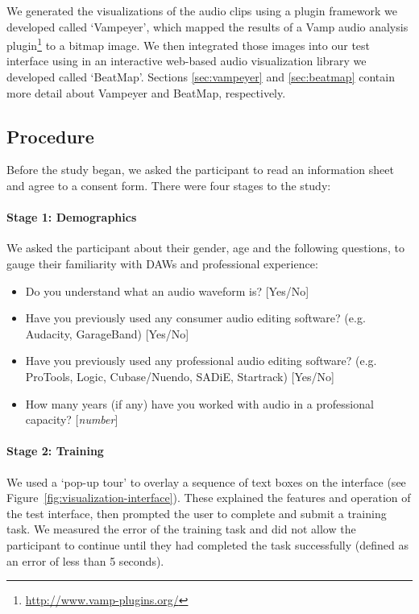 We generated the visualizations of the audio clips using a plugin framework we developed called `Vampeyer', which
mapped the results of a Vamp audio analysis plugin\footnote{\url{http://www.vamp-plugins.org/}} to a bitmap image. We
then integrated those images into our test interface using in an interactive web-based audio visualization library we
developed called `BeatMap'.  Sections \ref{sec:vampeyer} and \ref{sec:beatmap} contain more detail about Vampeyer and
BeatMap, respectively.

\subsection{Procedure}
Before the study began, we asked the participant to read an information sheet and agree to a consent form. There were
four stages to the study:

\paragraph{Stage 1: Demographics}
We asked the participant about their gender, age and the following questions, to gauge their familiarity with DAWs and
professional experience:

{\singlespacing
\begin{itemize}
  \item Do you understand what an audio waveform is? [Yes/No]
  \item Have you previously used any consumer audio editing software? (e.g.  Audacity, GarageBand) [Yes/No]
  \item Have you previously used any professional audio editing software? (e.g.  ProTools, Logic, Cubase/Nuendo, SADiE,
    Startrack) [Yes/No]
  \item How many years (if any) have you worked with audio in a professional capacity? [\textit{number}]
\end{itemize}
}

\paragraph{Stage 2: Training}
We used a `pop-up tour' to overlay a sequence of text boxes on the interface (see
Figure~\ref{fig:visualization-interface}). These explained the features and operation of the test interface, then
prompted the user to complete and submit a training task. We measured the error of the training task and did not allow
the participant to continue until they had completed the task successfully (defined as an error of less than 5 seconds).

